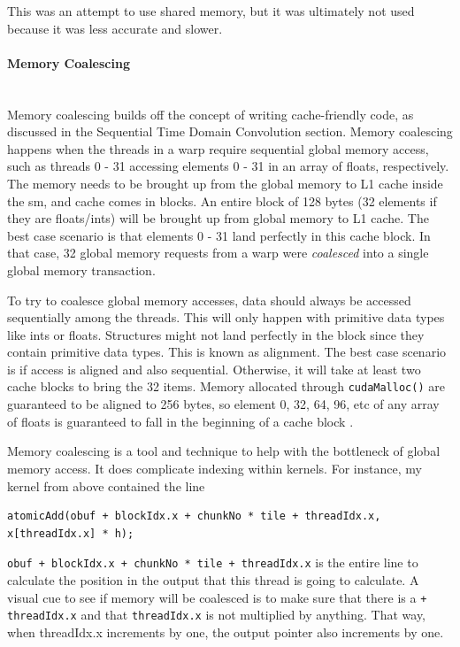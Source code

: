 This was an attempt to use shared memory, but it was ultimately not used because it was less accurate and slower. 
\paragraph{Memory Coalescing} \hspace{0pt} \\
\indent Memory coalescing builds off the concept of writing cache-friendly code, as discussed in the Sequential Time Domain Convolution section. Memory coalescing happens when the threads in a warp require sequential global memory access, such as threads 0 - 31 accessing elements 0 - 31 in an array of floats, respectively. The memory needs to be brought up from the global memory to L1 cache inside the \gls{sm}, and cache comes in blocks. An entire block of 128 bytes (32 elements if they are floats/ints) will be brought up from global memory to L1 cache. The best case scenario is that elements 0 - 31 land perfectly in this cache block. In that case, 32 global memory requests from a warp were \textit{coalesced} into a single global memory transaction. 

To try to coalesce global memory accesses, data should always be accessed sequentially among the threads. This will only happen with primitive data types like ints or floats. Structures might not land perfectly in the block since they contain primitive data types. This is known as alignment. The best case scenario is if access is aligned and also sequential. Otherwise, it will take at least two cache blocks to bring the 32 items. Memory allocated through \verb|cudaMalloc()| are guaranteed to be aligned to 256 bytes, so element 0, 32, 64, 96, etc of any array of floats is guaranteed to fall in the beginning of a cache block \citep{cudaCBestPractices}.

Memory coalescing is a tool and technique to help with the bottleneck of global memory access. It does complicate indexing within kernels. For instance, my kernel from above contained the line
\begin{verbatim}
atomicAdd(obuf + blockIdx.x + chunkNo * tile + threadIdx.x, x[threadIdx.x] * h);
\end{verbatim}

\verb|obuf + blockIdx.x + chunkNo * tile + threadIdx.x| is the entire line to calculate the position in the output that this thread is going to calculate. A visual cue to see if memory will be coalesced is to make sure that there is a \verb|+ threadIdx.x| and that \verb|threadIdx.x| is not multiplied by anything. That way, when threadIdx.x increments by one, the output pointer also increments by one. 

